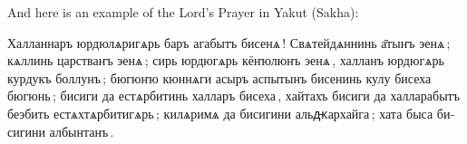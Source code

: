 And here is an example of the Lord's Prayer in Yakut (Sakha): \\

\begin{russian}
{\glyphfont \large
Халланнаръ юрдюлѧригѧрь баръ агабытъ бисенѧ ! Свѧтейдѧннинь а̄тыҥъ эенѧ ; кѧллинь царстваҥъ эенѧ ; сирь юрдюгѧрь кёҥюлюҥь эенѧ , халланъ юрдюгѧрь курдукъ боллунъ ; бюгюҥю кюннѧги асыръ аспытынъ бисенинь кулу бисеха бюгюнь ; бисиги да естѧрбитинь халларъ бисеха , хайтахъ бисиги да халларабытъ беэбить естѧхтѧрбитигѧрь ; килѧримѧ да бисигини альԫархайга ; хата быса бисигини албынтанъ .
}
\end{russian}
